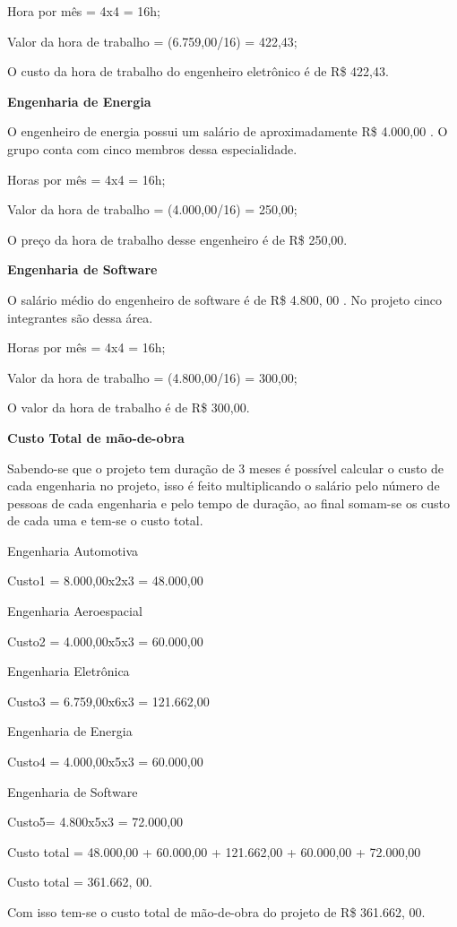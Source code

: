 	Hora por mês = 4x4 = 16h;
	
	Valor da hora de trabalho = (6.759,00/16) = 422,43;
	
	O custo da hora de trabalho do engenheiro eletrônico é de R\$ 422,43.
	
\textbf{Engenharia de Energia}

	O engenheiro de energia possui um salário de aproximadamente R\$ 4.000,00 \cite{profengene}. O grupo conta com cinco membros dessa especialidade.
	
	Horas por mês = 4x4 = 16h;
	
	Valor da hora de trabalho = (4.000,00/16) = 250,00;
	
	O preço da hora de trabalho desse engenheiro é de R\$ 250,00.
	
\textbf{Engenharia de Software}

	O salário médio do engenheiro de software é de R\$ 4.800, 00 \cite{blogdoenem}. No projeto cinco integrantes são dessa área.
	
	Horas por mês = 4x4 = 16h;
	
	Valor da hora de trabalho = (4.800,00/16) = 300,00;
	
	O valor da hora de trabalho é de R\$ 300,00.
	
\textbf{Custo Total de mão-de-obra}

	Sabendo-se que o projeto tem duração de 3 meses é possível calcular o custo de cada engenharia no projeto, isso é feito multiplicando o salário pelo número de pessoas de cada engenharia e pelo tempo de duração, ao final somam-se os custo de cada uma e tem-se o custo total.
	
	Engenharia Automotiva
	
	Custo1 = 8.000,00x2x3 = 48.000,00
	
	Engenharia Aeroespacial
	
	Custo2 = 4.000,00x5x3 = 60.000,00
	
	Engenharia Eletrônica
	
	Custo3 = 6.759,00x6x3 = 121.662,00
	
	Engenharia de Energia
	
	Custo4 = 4.000,00x5x3 = 60.000,00
	
	Engenharia de Software
	
	Custo5= 4.800x5x3 = 72.000,00
	
	Custo total = 48.000,00 + 60.000,00 + 121.662,00 + 60.000,00 + 72.000,00
	
	Custo total  = 361.662, 00.
	
	Com isso tem-se o custo total de mão-de-obra do projeto de R\$ 361.662, 00.

